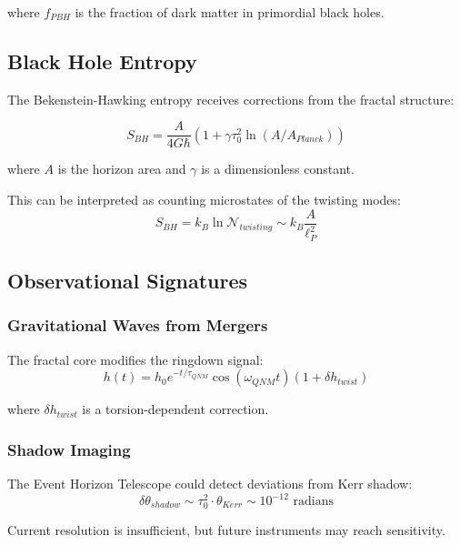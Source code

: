 where $f_{PBH}$ is the fraction of dark matter in primordial black holes.

\subsection{Black Hole Entropy}

The Bekenstein-Hawking entropy receives corrections from the fractal structure:

\begin{equation}
    S_{BH} = \frac{A}{4G\hbar}(1 + \gamma \tau_0^2 \ln(A/A_{Planck}))
\end{equation}

where $A$ is the horizon area and $\gamma$ is a dimensionless constant.

This can be interpreted as counting microstates of the twisting modes:
\begin{equation}
    S_{BH} = k_B \ln \mathcal{N}_{twisting} \sim k_B \frac{A}{\ell_P^2}
\end{equation}

\subsection{Observational Signatures}

\subsubsection{Gravitational Waves from Mergers}

The fractal core modifies the ringdown signal:
\begin{equation}
    h(t) = h_0 e^{-t/\tau_{QNM}} \cos(\omega_{QNM}t)(1 + \delta h_{twist})
\end{equation}

where $\delta h_{twist}$ is a torsion-dependent correction.

\subsubsection{Shadow Imaging}

The Event Horizon Telescope could detect deviations from Kerr shadow:
\begin{equation}
    \delta \theta_{shadow} \sim \tau_0^2 \cdot \theta_{Kerr} \sim 10^{-12} \text{ radians}
\end{equation}

Current resolution is insufficient, but future instruments may reach sensitivity.

